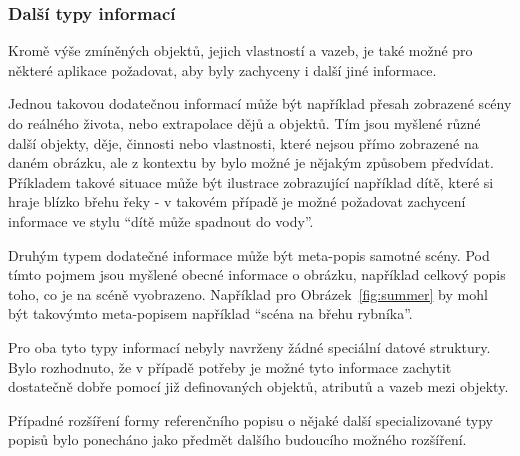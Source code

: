 \subsubsection{Další typy informací}
Kromě výše zmíněných objektů, jejich vlastností a vazeb, je také možné pro některé aplikace požadovat,
aby byly zachyceny i další jiné informace.

Jednou takovou dodatečnou informací může být například přesah zobrazené scény do reálného života, nebo extrapolace dějů a objektů.
Tím jsou myšlené různé další objekty, děje, činnosti nebo vlastnosti, které nejsou
přímo zobrazené na daném obrázku, ale z kontextu by bylo možné je nějakým způsobem předvídat.
Příkladem takové situace může být ilustrace zobrazující například dítě, které si hraje blízko břehu řeky - v takovém případě je možné
požadovat zachycení informace ve stylu \enquote{dítě může spadnout do vody}.

Druhým typem dodatečné informace může být meta-popis samotné scény.
Pod tímto pojmem jsou myšlené obecné informace o obrázku, například celkový popis toho, co je na scéně vyobrazeno.
Například pro Obrázek~\ref{fig:summer} by mohl být takovýmto meta-popisem například \enquote{scéna na břehu rybníka}.

Pro oba tyto typy informací nebyly navrženy žádné speciální datové struktury.
Bylo rozhodnuto, že v případě potřeby je možné tyto informace zachytit dostatečně dobře pomocí již definovaných
objektů, atributů a vazeb mezi objekty.

Případné rozšíření formy referenčního popisu o nějaké další specializované typy popisů bylo ponecháno jako předmět dalšího budoucího možného rozšíření.
